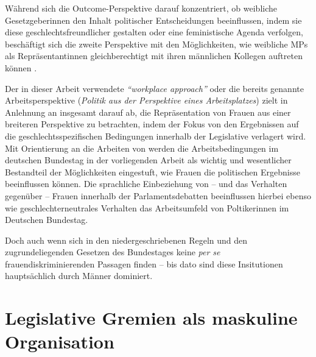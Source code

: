 \documentclass[12pt, 
    twoside=false, 
    bibliography=totoc, 
    numbers=endperiod, 
    headings=normal, 
    toc=chapterentrydotfill
    ]{scrbook}
\begin{document}
Während sich die Outcome-Perspektive darauf konzentriert, ob weibliche Gesetzgeberinnen den Inhalt politischer Entscheidungen beeinflussen, indem sie diese geschlechtsfreundlicher gestalten oder eine feministische Agenda verfolgen, beschäftigt sich die zweite Perspektive mit den Möglichkeiten, wie weibliche MPs als Repräsentantinnen gleichberechtigt mit ihren männlichen Kollegen auftreten können \parencites[199]{erikson_2018}{dahlerup_2006}{dahlerup_1988}.

Der in dieser Arbeit verwendete \emph{\enquote{workplace approach}} oder die bereits genannte Arbeitsperspektive  (\emph{Politik aus der Perspektive eines Arbeitsplatzes}) zielt in Anlehnung an \textcite{erikson_2018} insgesamt darauf ab, die Repräsentation von Frauen aus einer breiteren Perspektive zu betrachten, indem der Fokus von den Ergebnissen auf die geschlechtsspezifischen Bedingungen innerhalb der Legislative verlagert wird. Mit Orientierung an die Arbeiten von \textcites{dahlerup_2006}{dahlerup_1988}{erikson_2018} werden die  Arbeitsbedingungen im deutschen Bundestag in der vorliegenden Arbeit als wichtig und wesentlicher Bestandteil der Möglichkeiten eingestuft, wie Frauen die politischen Ergebnisse beeinflussen können. Die sprachliche Einbeziehung von -- und das Verhalten gegenüber -- Frauen innerhalb der Parlamentsdebatten beeinflussen hierbei ebenso wie geschlechterneutrales Verhalten das Arbeitsumfeld von Poltikerinnen im Deutschen Bundestag.

Doch auch wenn sich in den niedergeschriebenen Regeln und den zugrundeliegenden Gesetzen des Bundestages keine \emph{per se} frauendiskriminierenden Passagen finden -- bis dato sind diese Insitutionen hauptsächlich durch Männer dominiert.

\section{Legislative Gremien als maskuline Organisation}

\end{document}

